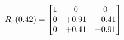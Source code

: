 \documentclass[preview]{standalone}
\begin{document}
\begin{align*}
\special{dvisvgm:raw <g id='unique000'>}R_{x}(0.42) = \begin{bmatrix}1 & 0 & 0 \\0 & +0.91 & -0.41 \\0 & +0.41 & +0.91\end{bmatrix}\special{dvisvgm:raw </g>}
\end{align*}
\end{document}
